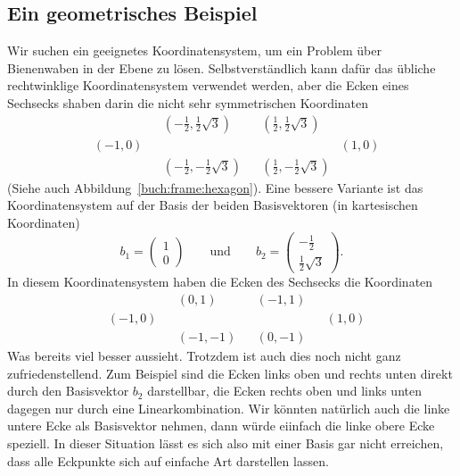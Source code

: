 \subsection{Ein geometrisches Beispiel}
Wir suchen ein geeignetes Koordinatensystem, um ein Problem über
Bienenwaben in der Ebene zu lösen.
Selbstverständlich kann dafür das übliche rechtwinklige Koordinatensystem
verwendet werden, aber die Ecken eines Sechsecks shaben darin die nicht
sehr symmetrischen Koordinaten
\begin{align*}
&      &&\textstyle(-\frac12,\frac12\sqrt{3})&&\textstyle( \frac12,\frac12\sqrt{3})&     \\
&(-1,0)&&                          &&                          &(1,0)\\
&      &&\textstyle(-\frac12,-\frac12\sqrt{3})&&\textstyle( \frac12,-\frac12\sqrt{3})&     
\end{align*}
(Siehe auch Abbildung~\ref{buch:frame:hexagon}).
Eine bessere Variante ist das Koordinatensystem auf der Basis der beiden
Basisvektoren (in kartesischen Koordinaten)
\[
b_1 = \begin{pmatrix} 1\\0\end{pmatrix}
\qquad
\text{und}
\qquad
b_2 = \begin{pmatrix} -\frac12\\\frac12\sqrt{3}\end{pmatrix}.
\]
In diesem Koordinatensystem haben die Ecken des Sechsecks die Koordinaten
\begin{align*}
&      &&(0,1)  &&(-1,1)&&     \\
&(-1,0)&&       &&      &&(1,0)\\
&      &&(-1,-1)&&(0,-1)&&
\end{align*}
Was bereits viel besser aussieht.
Trotzdem ist auch dies noch nicht ganz zufriedenstellend. 
Zum Beispiel sind die Ecken links oben und rechts unten direkt durch den
Basisvektor $b_2$ darstellbar, die Ecken rechts oben und links unten
dagegen nur durch eine Linearkombination.
Wir könnten natürlich auch die linke untere Ecke als Basisvektor nehmen,
dann würde eiinfach die linke obere Ecke speziell.
In dieser Situation lässt es sich also mit einer Basis gar nicht erreichen,
dass alle Eckpunkte sich auf einfache Art darstellen lassen.

